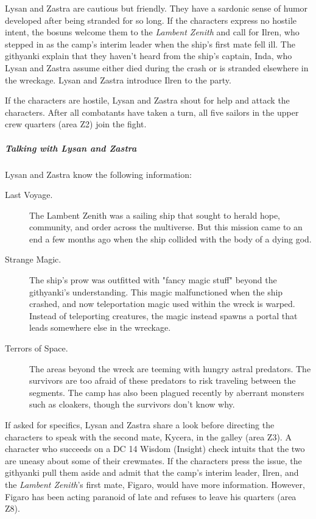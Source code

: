 \documentclass[10pt,a4paper,twoside,bg=print,twocolumn,openany,nodeprecatedcode]{dndbook}
\begin{document}
Lysan and Zastra are cautious but friendly. They have a sardonic sense of humor developed after being stranded for so long. If the characters express no hostile intent, the bosuns welcome them to the \textit{Lambent Zenith} and call for Ilren, who stepped in as the camp's interim leader when the ship's first mate fell ill. The githyanki explain that they haven't heard from the ship's captain, Inda, who Lysan and Zastra assume either died during the crash or is stranded elsewhere in the wreckage. Lysan and Zastra introduce Ilren to the party.

If the characters are hostile, Lysan and Zastra shout for help and attack the characters. After all combatants have taken a turn, all five sailors in the upper crew quarters (area Z2) join the fight.

\subparagraph{Talking with Lysan and Zastra}
Lysan and Zastra know the following information:


\begin{description}
\item[Last Voyage.]
The Lambent Zenith was a sailing ship that sought to herald hope, community, and order across the multiverse. But this mission came to an end a few months ago when the ship collided with the body of a dying god.
\item[Strange Magic.]
The ship's prow was outfitted with "fancy magic stuff" beyond the githyanki's understanding. This magic malfunctioned when the ship crashed, and now teleportation magic used within the wreck is warped. Instead of teleporting creatures, the magic instead spawns a portal that leads somewhere else in the wreckage.
\item[Terrors of Space.]
The areas beyond the wreck are teeming with hungry astral predators. The survivors are too afraid of these predators to risk traveling between the segments. The camp has also been plagued recently by aberrant monsters such as cloakers, though the survivors don't know why.
\end{description}

If asked for specifics, Lysan and Zastra share a look before directing the characters to speak with the second mate, Kycera, in the galley (area Z3). A character who succeeds on a DC 14 Wisdom (Insight) check intuits that the two are uneasy about some of their crewmates. If the characters press the issue, the githyanki pull them aside and admit that the camp's interim leader, Ilren, and the \textit{Lambent Zenith}'s first mate, Figaro, would have more information. However, Figaro has been acting paranoid of late and refuses to leave his quarters (area Z8).
\end{document}
